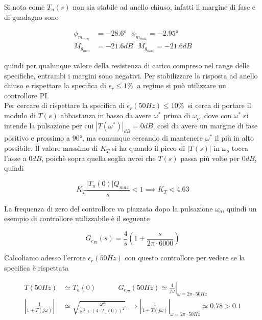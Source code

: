 \documentclass{article}
\begin{document}
\noindent
Si nota come \(T_u(s)\) non sia stabile ad anello chiuso, infatti il margine di fase e di guadagno sono

\vspace{0.5em}
\begin{align*}
    \phi_{m_{min}} &= -28.6\text{°} \ \ \
    \phi_{m_{max}} = -2.95\text{°} \\
    M_{g_{min}} &= -21.6dB \ \ \ 
    M_{g_{max}} = -21.6dB
\end{align*}
\vspace{0.5em}

\noindent
quindi per qualunque valore della resistenza di carico compreso nel range delle specifiche, entrambi i margini sono negativi.
Per stabilizzare la risposta ad anello chiuso e rispettare la specifica di \(\epsilon_r \leq 1\%\ \) a regime si può utilizzare un controllore PI. \\
Per cercare di rispettare la specifica di \(\epsilon_r(50Hz) \leq 10 \%\ \) si cerca di portare il modulo di \(T(s)\) abbastanza in basso da avere \(\omega^*\) prima di \(\omega_o\), dove con \(\omega^*\) si intende la pulsazione per cui \(|T(\omega^*)|_{dB} = 0dB\), così da avere un margine di fase positivo e prossimo a \(90\text{°}\), ma comunque cercando di mantenere \(\omega^*\) il più in alto possibile.
Il valore massimo di \(K_T\) si ha quando il picco di \(|T(s)|\) in \(\omega_o\) tocca l'asse a \(0dB\), poichè sopra quella soglia avrei che \(T(s)\) passa più volte per \(0dB\), quindi

\vspace{0.5em}
\[
    K_T \frac{|T_u(0)|Q_{max}}{s} < 1 \implies K_T < 4.63
\]
\vspace{0.5em}

\newpage
\noindent
La frequenza di zero del controllore va piazzata dopo la pulsazione \(\omega_o\), quindi un esempio di controllore utilizzabile è il seguente

\vspace{0.5em}
\[
    G_{c_{PI}}(s) = \frac{4}{s} (1 + \frac{s}{2 \pi \cdot 6000})
\]
\vspace{0.5em}

\noindent
Calcoliamo adesso l'errore \(\epsilon_r(50Hz)\) con questo controllore per vedere se la specifica è rispettata

\vspace{0.5em}
\begin{align*}
    T(50Hz) &\simeq T_u(0) \ \ \ \ \ \ \ \ \ \ \ \ \ \
    G_{c_{PI}}(50Hz) \simeq  \left. \frac{4}{j\omega} \right|_{\omega = 2\pi \cdot 50Hz} \\
    \left| \frac{1}{1+T(j\omega)} \right| &\simeq \sqrt{\frac{\omega^2}{\omega^2 + (4 \cdot T_u(0))^2}} \implies \left| \frac{1}{1+T(j\omega)} \right|_{\omega=2\pi \cdot 50Hz} \simeq 0.78 > 0.1
\end{align*}
\vspace{0.5em}
\end{document}
